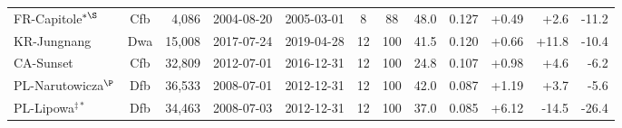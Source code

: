 \begin{table}[!tbp]
\begin{tabular}{lcrcccccccrr}
FR-Capitole$^{\ast\S}$ & Cfb & 4,086 & 2004-08-20 & 2005-03-01 & 8 & 88 & 48.0 & 0.127 & +0.49 & +2.6 & -11.2 \\
KR-Jungnang & Dwa & 15,008 & 2017-07-24 & 2019-04-28 & 12 & 100 & 41.5 & 0.120 & +0.66 & +11.8 & -10.4 \\
CA-Sunset & Cfb & 32,809 & 2012-07-01 & 2016-12-31 & 12 & 100 & 24.8 & 0.107 & +0.98 & +4.6 & -6.2 \\
PL-Narutowicza$^{\P}$ & Dfb & 36,533 & 2008-07-01 & 2012-12-31 & 12 & 100 & 42.0 & 0.087 & +1.19 & +3.7 & -5.6 \\
PL-Lipowa$^{\ddagger\ast}$ & Dfb & 34,463 & 2008-07-03 & 2012-12-31 & 12 & 100 & 37.0 & 0.085 & +6.12 & -14.5 & -26.4 \\
\bottomrule
\end{tabular}
\endgroup
\par{}
\end{table}
